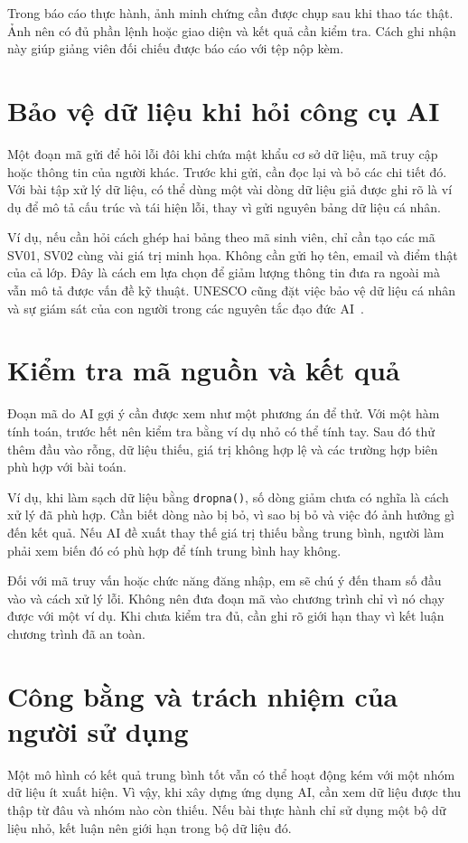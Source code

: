\documentclass[pdflatex,sn-mathphys-num]{sn-jnl}
\begin{document}
Trong báo cáo thực hành, ảnh minh chứng cần được chụp sau khi thao tác thật. Ảnh nên có đủ phần lệnh hoặc giao diện và kết quả cần kiểm tra. Cách ghi nhận này giúp giảng viên đối chiếu được báo cáo với tệp nộp kèm.

\section{Bảo vệ dữ liệu khi hỏi công cụ AI}
Một đoạn mã gửi để hỏi lỗi đôi khi chứa mật khẩu cơ sở dữ liệu, mã truy cập hoặc thông tin của người khác. Trước khi gửi, cần đọc lại và bỏ các chi tiết đó. Với bài tập xử lý dữ liệu, có thể dùng một vài dòng dữ liệu giả được ghi rõ là ví dụ để mô tả cấu trúc và tái hiện lỗi, thay vì gửi nguyên bảng dữ liệu cá nhân.

Ví dụ, nếu cần hỏi cách ghép hai bảng theo mã sinh viên, chỉ cần tạo các mã SV01, SV02 cùng vài giá trị minh họa. Không cần gửi họ tên, email và điểm thật của cả lớp. Đây là cách em lựa chọn để giảm lượng thông tin đưa ra ngoài mà vẫn mô tả được vấn đề kỹ thuật. UNESCO cũng đặt việc bảo vệ dữ liệu cá nhân và sự giám sát của con người trong các nguyên tắc đạo đức AI~\cite{unesco2021}.

\section{Kiểm tra mã nguồn và kết quả}
Đoạn mã do AI gợi ý cần được xem như một phương án để thử. Với một hàm tính toán, trước hết nên kiểm tra bằng ví dụ nhỏ có thể tính tay. Sau đó thử thêm đầu vào rỗng, dữ liệu thiếu, giá trị không hợp lệ và các trường hợp biên phù hợp với bài toán.

Ví dụ, khi làm sạch dữ liệu bằng \texttt{dropna()}, số dòng giảm chưa có nghĩa là cách xử lý đã phù hợp. Cần biết dòng nào bị bỏ, vì sao bị bỏ và việc đó ảnh hưởng gì đến kết quả. Nếu AI đề xuất thay thế giá trị thiếu bằng trung bình, người làm phải xem biến đó có phù hợp để tính trung bình hay không.

Đối với mã truy vấn hoặc chức năng đăng nhập, em sẽ chú ý đến tham số đầu vào và cách xử lý lỗi. Không nên đưa đoạn mã vào chương trình chỉ vì nó chạy được với một ví dụ. Khi chưa kiểm tra đủ, cần ghi rõ giới hạn thay vì kết luận chương trình đã an toàn.

\section{Công bằng và trách nhiệm của người sử dụng}
Một mô hình có kết quả trung bình tốt vẫn có thể hoạt động kém với một nhóm dữ liệu ít xuất hiện. Vì vậy, khi xây dựng ứng dụng AI, cần xem dữ liệu được thu thập từ đâu và nhóm nào còn thiếu. Nếu bài thực hành chỉ sử dụng một bộ dữ liệu nhỏ, kết luận nên giới hạn trong bộ dữ liệu đó.
\end{document}
